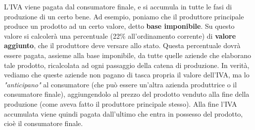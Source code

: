 \documentclass[a4paper,11pt]{article}
\begin{document}
\par\smallskip

L'IVA viene pagata dal consumatore finale, e si accumula in tutte le fasi di produzione di un certo bene.
Ad esempio, poniamo che il produttore principale produce un prodotto ad un certo valore, detto \textbf{base imponibile}.
Su questo valore si calcolerà una percentuale (22\% all'ordinamento corrente) di \textbf{valore aggiunto}, che il produttore deve versare allo stato.
Questa percentuale dovrà essere pagata, assieme alla base imponibile, da tutte quelle aziende che elaborano tale prodotto, ricalcolata ad ogni passaggio della catena di produzione.
In verità, vediamo che queste aziende non pagano di tasca propria il valore dell'IVA, ma lo \textit{"anticipano"} al consumatore (che può essere un'altra azienda produttrice o il consumatore finale), aggiungendolo al prezzo del prodotto venduto alla fine della produzione (come aveva fatto il produttore principale stesso).
Alla fine l'IVA accumulata viene quindi pagata dall'ultimo che entra in possesso del prodotto, cioè il consumatore finale.
\end{document}
